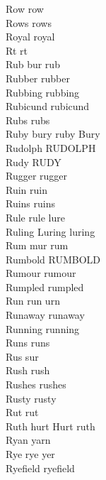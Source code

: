 Row row\\
Rows rows\\
Royal royal\\
Rt rt\\
Rub bur rub\\
Rubber rubber\\
Rubbing rubbing\\
Rubicund rubicund\\
Rubs rubs\\
Ruby bury ruby Bury\\
Rudolph RUDOLPH\\
Rudy RUDY\\
Rugger rugger\\
Ruin ruin\\
Ruins ruins\\
Rule rule lure\\
Ruling Luring luring\\
Rum mur rum\\
Rumbold RUMBOLD\\
Rumour rumour\\
Rumpled rumpled\\
Run run urn\\
Runaway runaway\\
Running running\\
Runs runs\\
Rus sur\\
Rush rush\\
Rushes rushes\\
Rusty rusty\\
Rut rut\\
Ruth hurt Hurt ruth\\
Ryan yarn\\
Rye rye yer\\
Ryefield ryefield\\

